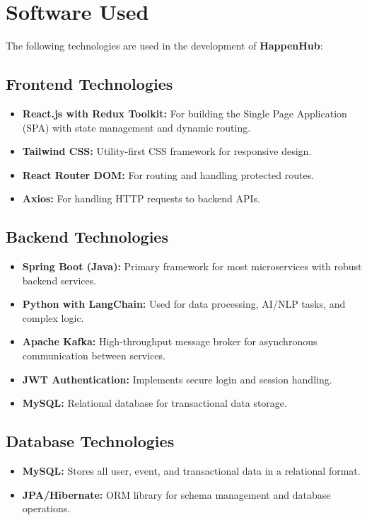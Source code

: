 \documentclass[12pt,a4paper]{report}
\begin{document}
\section{Software Used}

The following technologies are used in the development of \textbf{HappenHub}:

\subsection*{Frontend Technologies}
\begin{itemize}
    \item \textbf{React.js with Redux Toolkit:} For building the Single Page Application (SPA) with state management and dynamic routing.
    \item \textbf{Tailwind CSS:} Utility-first CSS framework for responsive design.
    \item \textbf{React Router DOM:} For routing and handling protected routes.
    \item \textbf{Axios:} For handling HTTP requests to backend APIs.
\end{itemize}

\subsection*{Backend Technologies}
\begin{itemize}
    \item \textbf{Spring Boot (Java):} Primary framework for most microservices with robust backend services.
    \item \textbf{Python with LangChain:} Used for data processing, AI/NLP tasks, and complex logic.
    \item \textbf{Apache Kafka:} High-throughput message broker for asynchronous communication between services.
    \item \textbf{JWT Authentication:} Implements secure login and session handling.
    \item \textbf{MySQL:} Relational database for transactional data storage.
\end{itemize}

\subsection*{Database Technologies}
\begin{itemize}
    \item \textbf{MySQL:} Stores all user, event, and transactional data in a relational format.
    \item \textbf{JPA/Hibernate:} ORM library for schema management and database operations.
\end{itemize}
\end{document}

